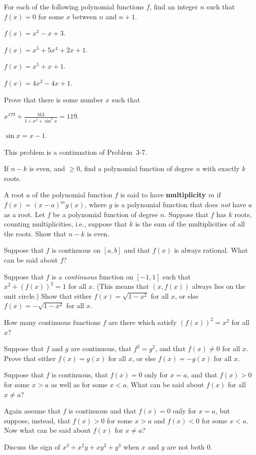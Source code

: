  For each of the following polynomial functions $f$, find an integer
$n$ such that $f(x)=0$ for some $x$ between $n$ and $n+1$.
\begin{romans}
\item $f(x)=x^3-x+3$.
\item $f(x)=x^5+5x^4+2x+1$.
\item $f(x)=x^5+x+1$.
\item $f(x)=4x^2-4x+1$.
\end{romans}

 Prove that there is some number $x$ such that
\begin{romans}
\item $\displaystyle x^{179}+\frac{163}{1+x^2+\sin^2 x}=119$.
\item $\sin x=x-1$.
\end{romans}

 This problem is a continuation of Problem~3-7.
\begin{letters}
\item If $n-k$ is even, and $\geq 0$, find a polynomial function of degree $n$
with exactly $k$ roots.
\item A root $a$ of the polynomial function $f$ is said to have
\textbf{multiplicity $m$} if $f(x)=(x-a)^m g(x)$, where $g$ is a polynomial
function that does \emph{not} have $a$ as a root. Let $f$ be a polynomial
function of degree $n$. Suppose that $f$ has $k$ roots, counting
multiplicities, i.e., suppose that $k$ is the sum of the multiplicities of all
the roots. Show that $n-k$ is even.
\end{letters}

 Suppose that $f$ is continuous on $[a,b]$ and that $f(x)$ is always
rational. What can be said about $f$?

 Suppose that $f$ is a \emph{continuous} function on $[-1,1]$ such that
$x^2+(f(x))^2=1$ for all $x$. (This means that $(x,f(x))$ always lies on the
unit circle.) Show that either $f(x)=\sqrt{1-x^2}$ for all $x$, or else
$f(x)=-\sqrt{1-x^2}$ for all $x$.

 How many continuous functions $f$ are there which satisfy
$(f(x))^2=x^2$ for all $x$?

 Suppose that $f$ and $g$ are continuous, that $f^2=g^2$, and that
$f(x)\neq 0$ for all $x$. Prove that either $f(x)=g(x)$ for all $x$, or else
$f(x)=-g(x)$ for all $x$.

\begin{letters}
\item Suppose that $f$ is continuous, that $f(x)=0$ only for $x=a$, and that
$f(x)>0$ for some $x>a$ as well as for some $x<a$. What can be said about
$f(x)$ for all $x\neq a$?
\item Again assume that $f$ is continuous and that $f(x)=0$ only for $x=a$, but
suppose, instead, that $f(x)>0$ for some $x>a$ and $f(x)<0$ for some $x<a$. Now
what can be said about $f(x)$ for $x\neq a$?
\item[\textbf{*(c)}] Discuss the sign of $x^3+x^2 y+xy^2+y^3$ when $x$ and $y$
are not both $0$.
\end{letters}

